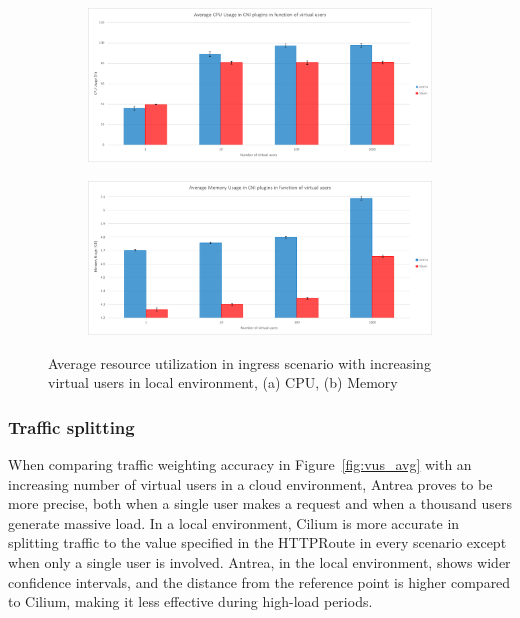 \begin{figure}[H]
    \centering
    \begin{subfigure}[b]{0.8\textwidth}
        \includegraphics[width=\textwidth]{plots/traffic-splitting/cpu_local.png}
        \caption{}
        \label{fig:cpu_local_avg}
    \end{subfigure}
    \begin{subfigure}[b]{0.8\textwidth}
        \includegraphics[width=\textwidth]{plots/traffic-splitting/memory_local.png}
        \caption{}
        \label{fig:memory_local_avg}
    \end{subfigure}
    
    \caption{Average resource utilization in ingress scenario with increasing virtual users in local environment, (a) CPU, (b) Memory}
    \label{fig:resource_local_avg}
\end{figure}

\subsubsection{Traffic splitting}
\label{sec:ingressTrafficSplitting}

When comparing traffic weighting accuracy in Figure~\ref{fig:vus_avg} with an increasing number of virtual users in a cloud environment, Antrea proves to be more precise, both when a single user makes a request and when a thousand users generate massive load. In a local environment, Cilium is more accurate in splitting traffic to the value specified in the HTTPRoute in every scenario except when only a single user is involved. Antrea, in the local environment, shows wider confidence intervals, and the distance from the reference point is higher compared to Cilium, making it less effective during high-load periods.


